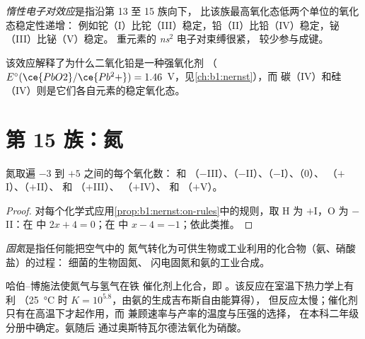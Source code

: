 \begin{definition}[惰性电子对效应]\label{def:b1:p-block-13-15:inert-pair}
\emph{惰性电子对效应}是指沿第 13 至 15 族向下，
比该族最高氧化态低两个单位的氧化态稳定性递增：
例如铊（I）比铊（III）稳定，铅（II）比铅（IV）稳定，铋（III）比铋（V）稳定。
重元素的 \textit{ns}$^2$ 电子对束缚很紧，
较少参与成键。
\end{definition}

该效应解释了为什么二氧化铅是一种强氧化剂
（$E^\circ(\ce{PbO2}/\ce{Pb^2+}) = 1.46$~V，见\cref{ch:b1:nernst}），而
碳（IV）和硅（IV）则是它们各自元素的稳定氧化态。

\section{第 15 族：氮}

\begin{proposition}[氮的阶梯]\label{prop:b1:p-block-13-15:nitrogen-ladder}
氮取遍 $-3$ 到 $+5$ 之间的每个氧化数： 和
（$-$III）、（$-$II）、（$-$I）、（0）、
（$+$I）、（$+$II）、 和 （$+$III）、
（$+$IV）、 和 （$+$V）。
\end{proposition}

\begin{proof}
对每个化学式应用\cref{prop:b1:nernst:on-rules}中的规则，取 H 为
$+$I，O 为 $-$II：在  中 $2x + 4 = 0$；在  中 $x - 4 =
-1$；依此类推。
\end{proof}

\begin{definition}[固氮]\label{def:b1:p-block-13-15:nitrogen-fixation}
\emph{固氮}是指任何能把空气中的
氮气转化为可供生物或工业利用的化合物（氨、硝酸盐）的过程：
细菌的生物固氮、
闪电固氮和氨的工业合成。
\end{definition}

哈伯–博施法使氮气与氢气在铁
催化剂上化合，即 。该反应在室温下热力学上有利
（\qty{25}{\celsius} 时 $K = 10^{5.8}$，由氨的生成吉布斯自由能算得），
但反应太慢；催化剂只有在高温下才起作用，而
兼顾速率与产率的温度与压强的选择，
在本科二年级分册中确定。氨随后
通过奥斯特瓦尔德法氧化为硝酸。

